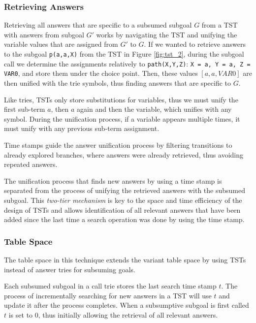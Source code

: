 \subsubsection{Retrieving Answers}

Retrieving all answers that are specific to a subsumed subgoal $G$ from a TST with answers from subgoal $G'$
works by navigating the TST and unifying the variable values that are assigned from $G'$ to $G$.
If we wanted to retrieve answers to the subgoal \texttt{p(a,a,X)} from the TST in Figure \ref{fig:tst_2},
during the subgoal call we determine the assignments relatively to \texttt{path(X,Y,Z)}: \texttt{X = a, Y = a, Z = VAR0},
and store them under the choice point. Then, these values $[a, a, VAR0]$ are then unified
with the trie symbols, thus finding answers that are specific to $G$.

Like tries, TSTs only store substitutions for variables, thus we must unify
the first sub-term $a$, then $a$ again and then the variable, which unifies with any symbol.
During the unification process, if a variable appears multiple times, it must unify with
any previous sub-term assignment.

Time stamps guide the answer unification process by filtering transitions to already explored branches, where
answers were already retrieved, thus avoiding repeated answers.

The unification process that finds new answers by using a time stamp is separated from the process
of unifying the retrieved answers with the subsumed subgoal. This \textit{two-tier mechanism} is key to the space and time
efficiency of the design of TSTs \cite{Johnson-99} and allows identification of all relevant answers that have
been added since the last time a search operation was done by using the time stamp.

\subsubsection{Table Space}

The table space in this technique extends the variant table space by
using TSTs instead of answer tries for subsuming goals.
 
Each subsumed subgoal in a call trie stores the last search time stamp $t$. The process of
incrementally searching for new answers in a TST will use $t$ and update it after the process completes.
When a subsumptive subgoal is first called $t$ is set to $0$, thus initially allowing the retrieval of all
relevant answers.


